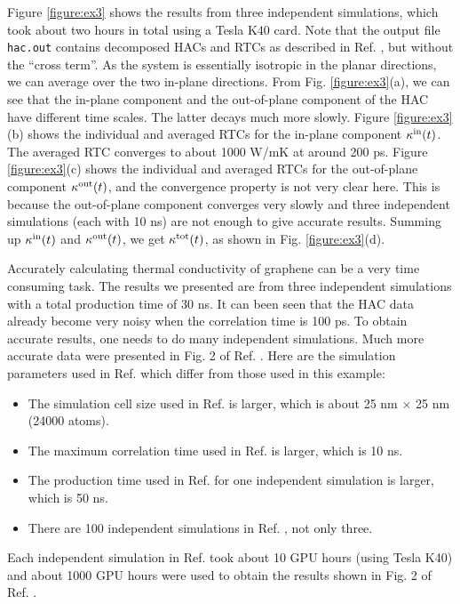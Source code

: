 \documentclass[12pt,a4paper]{report}
\begin{document}
Figure \ref{figure:ex3} shows the results from three independent simulations, which took about two hours in total using a Tesla K40 card. Note that the output file \verb"hac.out" contains decomposed HACs and RTCs as described in Ref. \cite{fan2017prb}, but without the ``cross term''. As the system is essentially isotropic in the planar directions, we can average over the two in-plane directions. From Fig. \ref{figure:ex3}(a), we can see that the in-plane component and the out-of-plane component of the HAC have different time scales. The latter decays much more slowly. Figure \ref{figure:ex3}(b) shows the individual and averaged RTCs for the in-plane component $\kappa^{\rm in}(t)$. The averaged RTC converges to about 1000 W/mK at around 200 ps. Figure \ref{figure:ex3}(c) shows the individual and averaged RTCs for the out-of-plane component $\kappa^{\rm out}(t)$, and the convergence property is not very clear here. This is because the out-of-plane component converges very slowly \cite{fan2017prb} and three independent simulations (each with 10 ns) are not enough to give accurate results. Summing up $\kappa^{\rm in}(t)$ and $\kappa^{\rm out}(t)$, we get $\kappa^{\rm tot}(t)$, as shown in Fig. \ref{figure:ex3}(d).

Accurately calculating thermal conductivity of graphene can be a very time consuming task. The results we presented are from three independent simulations with a total production time of 30 ns. It can been seen that the HAC data already become very noisy when the correlation time is 100 ps. To obtain accurate results, one needs to do many independent simulations. Much more accurate data were presented in Fig. 2 of Ref. \cite{fan2017prb}. Here are the simulation parameters used in Ref. \cite{fan2017prb} which differ from those used in this example:
\begin{itemize}
\item The simulation cell size used in Ref. \cite{fan2017prb} is larger, which is about 25 nm $\times$ 25 nm (24000 atoms).
\item The maximum correlation time used in Ref. \cite{fan2017prb} is larger, which is 10 ns.
\item The production time used in Ref. \cite{fan2017prb} for one independent simulation is larger, which is 50 ns.
\item There are 100 independent simulations in Ref. \cite{fan2017prb}, not only three.
\end{itemize}

Each independent simulation in Ref. \cite{fan2017prb} took about 10 GPU hours (using Tesla K40) and about 1000 GPU hours were used to obtain the results shown in Fig. 2 of Ref. \cite{fan2017prb}.
\end{document}
